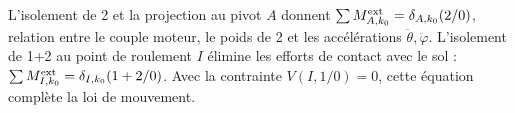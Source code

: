 \begin{corrigebox}
L'isolement de 2 et la projection au pivot $A$ donnent
                $\sum M_{A,k_0}^{\rm ext}=\delta_{A,k_0}(2/0)$, relation entre le couple
                moteur, le poids de 2 et les accélérations $\ddot\theta,\ddot\varphi$.
L'isolement de 1+2 au point de roulement $I$ élimine les efforts de
                contact avec le sol :
                $\sum M_{I,k_0}^{\rm ext}=\delta_{I,k_0}(1+2/0)$. Avec la contrainte
                $V(I,1/0)=0$, cette équation complète la loi de mouvement.
\end{corrigebox}
